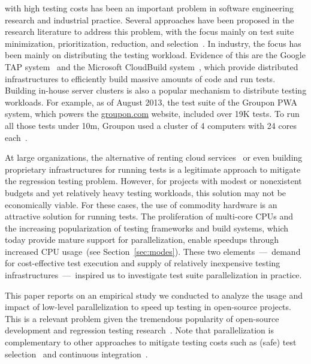 with high testing costs has been an important problem in
software engineering research and industrial practice.  Several
approaches have been proposed in the research literature to address
this problem, with the focus mainly on test suite minimization,
prioritization, reduction, and selection~\cite{yoo-harman-stvr2012}.
In industry, the focus has been mainly on distributing the testing
workload.  Evidence of this are the Google TAP
system~\cite{google-tap,google-ci} and the Microsoft CloudBuild
system~\cite{prasad-shulte-ieee-microsoft-ci}, which provide
distributed infrastructures to efficiently build massive amounts of
code and run tests.  Building in-house server clusters is also a
popular mechanism to distribute testing workloads.  For example, as of
August 2013, the test suite of the Groupon PWA system, which powers
the \url{groupon.com} website, included over 19K tests.  To run all
those tests under 10m, Groupon used a cluster of 4 computers with 24
cores each~\cite{kim-etal-fse2013}.

At large organizations, the alternative of renting cloud
services~\cite{cloud-services} or even building proprietary
infrastructures for running tests is a legitimate approach to mitigate
the regression testing problem.  However, for projects with modest
 or nonexistent budgets and yet relatively heavy testing workloads, this solution may
not be economically viable.  For these cases, the use of commodity
hardware is an attractive
solution for running tests.  The proliferation of
multi-core CPUs and the increasing popularization of testing
frameworks and build systems, which today provide mature support for
parallelization, enable speedups through increased CPU
usage~(see Section~\ref{sec:modes}).  These two elements~---~demand
for cost-effective test execution and supply of relatively inexpensive
testing infrastructures~---~inspired us to investigate 
test suite parallelization in practice.

This paper reports on an empirical study we conducted to analyze the
usage and impact of low-level parallelization to speed up testing in
open-source projects.  This is a relevant problem given the tremendous
popularity of open-source development and regression testing
research~\cite{yoo-harman-stvr2012}.  Note that parallelization is
complementary to other approaches to mitigate testing costs such as
(safe) test
selection~\cite{Rothermel:1997:SER:248233.248262,gligoric-etal-issta2015}
and continuous integration~\cite{Saff:2003:RWD:951952.952340}.

